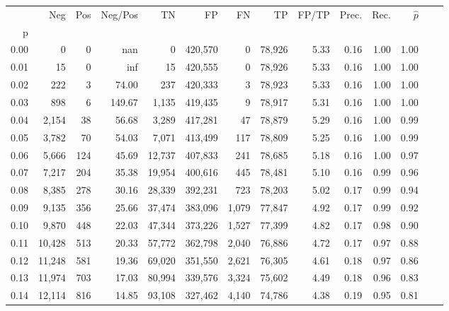 \begin{tabular}{rrrrrrrrrrrrrr}
\toprule
{} &     Neg &    Pos & Neg/Pos &       TN &       FP &      FN &      TP & FP/TP & Prec. &  Rec. & $\hat{p}$ \\
p    &         &        &         &          &          &         &         &       &       &       &           \\
\midrule
0.00 &       0 &      0 &     nan &        0 &  420,570 &       0 &  78,926 &  5.33 &  0.16 &  1.00 &      1.00 \\
0.01 &      15 &      0 &     inf &       15 &  420,555 &       0 &  78,926 &  5.33 &  0.16 &  1.00 &      1.00 \\
0.02 &     222 &      3 &   74.00 &      237 &  420,333 &       3 &  78,923 &  5.33 &  0.16 &  1.00 &      1.00 \\
0.03 &     898 &      6 &  149.67 &    1,135 &  419,435 &       9 &  78,917 &  5.31 &  0.16 &  1.00 &      1.00 \\
0.04 &   2,154 &     38 &   56.68 &    3,289 &  417,281 &      47 &  78,879 &  5.29 &  0.16 &  1.00 &      0.99 \\
0.05 &   3,782 &     70 &   54.03 &    7,071 &  413,499 &     117 &  78,809 &  5.25 &  0.16 &  1.00 &      0.99 \\
0.06 &   5,666 &    124 &   45.69 &   12,737 &  407,833 &     241 &  78,685 &  5.18 &  0.16 &  1.00 &      0.97 \\
0.07 &   7,217 &    204 &   35.38 &   19,954 &  400,616 &     445 &  78,481 &  5.10 &  0.16 &  0.99 &      0.96 \\
0.08 &   8,385 &    278 &   30.16 &   28,339 &  392,231 &     723 &  78,203 &  5.02 &  0.17 &  0.99 &      0.94 \\
0.09 &   9,135 &    356 &   25.66 &   37,474 &  383,096 &   1,079 &  77,847 &  4.92 &  0.17 &  0.99 &      0.92 \\
0.10 &   9,870 &    448 &   22.03 &   47,344 &  373,226 &   1,527 &  77,399 &  4.82 &  0.17 &  0.98 &      0.90 \\
0.11 &  10,428 &    513 &   20.33 &   57,772 &  362,798 &   2,040 &  76,886 &  4.72 &  0.17 &  0.97 &      0.88 \\
0.12 &  11,248 &    581 &   19.36 &   69,020 &  351,550 &   2,621 &  76,305 &  4.61 &  0.18 &  0.97 &      0.86 \\
0.13 &  11,974 &    703 &   17.03 &   80,994 &  339,576 &   3,324 &  75,602 &  4.49 &  0.18 &  0.96 &      0.83 \\
0.14 &  12,114 &    816 &   14.85 &   93,108 &  327,462 &   4,140 &  74,786 &  4.38 &  0.19 &  0.95 &      0.81 \\

\end{tabular}

